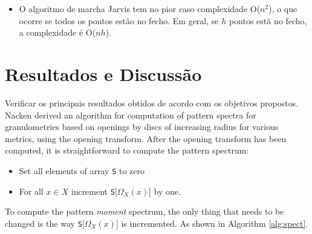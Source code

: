 \documentclass{sciposter}
\begin{document}
\begin{multicols}{3}
\begin{itemize}
\begin{center}
\end{center}

\item O algoritmo de marcha Jarvis tem no pior caso complexidade O($n^2$), o que ocorre se todos os pontos estão no fecho. Em geral, se $h$ pontos estã no fecho, a complexidade é O($nh$).


\end{itemize}


\section{Resultados e Discussão}

Verificar os principais resultados obtidos de acordo com os objetivos propostos.\\

Nacken \cite{Nacken:thesis} derived an algorithm for computation
of pattern spectra for granulometries based on openings by discs of increasing
radius for various metrics, using the opening transform. After the
opening transform has been computed, it is straightforward to compute the
pattern spectrum:
\begin{itemize}
\item Set all elements of array {\tt S} to zero
\item For all $x \in X$ increment {\tt S}[$\Omega_X(x)$] by one.
\end{itemize}

To compute the pattern \emph{moment} spectrum, the only thing that needs to be
changed is the way {\tt S}[$\Omega_X(x)$] is incremented. As shown in Algorithm
\ref{alg:spect}.


\end{multicols}
\end{document}
